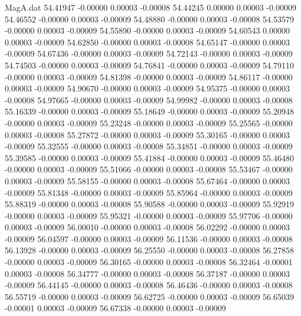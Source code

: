 \begin{filecontents}{MagA.dat}
  54.41947   -0.00000    0.00003   -0.00008
  54.44245    0.00000    0.00003   -0.00009
  54.46552   -0.00000    0.00003   -0.00009
  54.48880   -0.00000    0.00003   -0.00008
  54.53579   -0.00000    0.00003   -0.00009
  54.55890   -0.00000    0.00003   -0.00009
  54.60543    0.00000    0.00003   -0.00009
  54.62850   -0.00000    0.00003   -0.00008
  54.65147   -0.00000    0.00003   -0.00009
  54.67436   -0.00000    0.00003   -0.00009
  54.72143   -0.00000    0.00003   -0.00009
  54.74503   -0.00000    0.00003   -0.00009
  54.76841   -0.00000    0.00003   -0.00009
  54.79110   -0.00000    0.00003   -0.00009
  54.81398   -0.00000    0.00003   -0.00009
  54.86117   -0.00000    0.00003   -0.00009
  54.90670   -0.00000    0.00003   -0.00009
  54.95375   -0.00000    0.00003   -0.00008
  54.97665   -0.00000    0.00003   -0.00009
  54.99982   -0.00000    0.00003   -0.00008
  55.16339   -0.00000    0.00003   -0.00009
  55.18649   -0.00000    0.00003   -0.00009
  55.20948   -0.00000    0.00003   -0.00009
  55.23248   -0.00000    0.00003   -0.00009
  55.25565   -0.00000    0.00003   -0.00008
  55.27872   -0.00000    0.00003   -0.00009
  55.30165   -0.00000    0.00003   -0.00009
  55.32555   -0.00000    0.00003   -0.00008
  55.34851   -0.00000    0.00003   -0.00009
  55.39585   -0.00000    0.00003   -0.00009
  55.41884   -0.00000    0.00003   -0.00009
  55.46480   -0.00000    0.00003   -0.00009
  55.51066   -0.00000    0.00003   -0.00008
  55.53467   -0.00000    0.00003   -0.00009
  55.58155   -0.00000    0.00003   -0.00008
  55.67464   -0.00000    0.00003   -0.00009
  55.81348   -0.00000    0.00003   -0.00009
  55.85964   -0.00000    0.00003   -0.00009
  55.88319   -0.00000    0.00003   -0.00008
  55.90588   -0.00000    0.00003   -0.00009
  55.92919   -0.00000    0.00003   -0.00009
  55.95321   -0.00000    0.00003   -0.00009
  55.97706   -0.00000    0.00003   -0.00009
  56.00010   -0.00000    0.00003   -0.00008
  56.02292   -0.00000    0.00003   -0.00009
  56.04597   -0.00000    0.00003   -0.00009
  56.11536   -0.00000    0.00003   -0.00008
  56.13928   -0.00000    0.00003   -0.00009
  56.25550   -0.00000    0.00003   -0.00008
  56.27858   -0.00000    0.00003   -0.00009
  56.30165   -0.00000    0.00003   -0.00008
  56.32464   -0.00001    0.00003   -0.00008
  56.34777   -0.00000    0.00003   -0.00008
  56.37187   -0.00000    0.00003   -0.00009
  56.44145   -0.00000    0.00003   -0.00008
  56.46436   -0.00000    0.00003   -0.00008
  56.55719   -0.00000    0.00003   -0.00009
  56.62725   -0.00000    0.00003   -0.00009
  56.65039   -0.00001    0.00003   -0.00009
  56.67338   -0.00000    0.00003   -0.00009

\end{filecontents}
